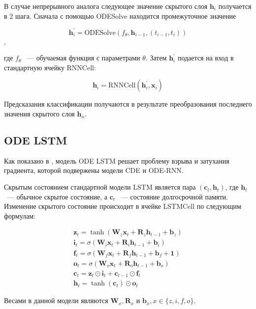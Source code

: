 \documentclass{article}
\newcommand{\bb}{\mathbf{b}}
\newcommand{\W}{\mathbf{W}}
\newcommand{\x}{\mathbf{x}}
\newcommand{\cc}{\mathbf{c}}
\newcommand{\h}{\mathbf{h}}
\begin{document}
В случае непрерывного аналога следующее значение скрытого слоя $\mathbf{h}_i$ получается в 2 шага. Сначала с помощью ODESolve находится промежуточное значение 

$$\mathbf{h}_i^{\prime} = \text{ODESolve}(f_{\theta}, \mathbf{h}_{i-1}, (t_{i-1}, t_i))$$,

где $f_{\theta}$ ~--- обучаемая функция с параметрами $\theta$. Затем $\mathbf{h}_i^{\prime}$ подается на вход в стандартную ячейку RNNCell:

$$\mathbf{h}_i = \text{RNNCell}(\mathbf{h}_i^{\prime}, \mathbf{x}_i)$$

Предсказания классификации получаются в результате преобразования последнего значения скрытого слоя $\mathbf{h}_n$. 

\subsection{ODE LSTM}

Как показано в \cite{lechner2020longterm}, модель ODE LSTM решает проблему взрыва и затухания градиента, которой подвержены модели CDE и ODE-RNN.

Скрытым состоянием стандартной модели LSTM является пара $(\mathbf{c}_t, \mathbf{h}_t)$, где $\mathbf{h}_t$ ~--- обычное скрытое состояние, а $\mathbf{c}_t$ ~--- состояние долгосрочной памяти. Изменение скрытого состояние происходит в ячейке LSTMCell по следующим формулам:

\begin{equation*}
\begin{array}{l}

\mathbf{z}_{t}=\tanh \left(\W_{z} \x_{t}+\mathbf{R}_{z} \h_{t-1}+\bb_{z}\right)\\
\mathbf{i}_{t}=\sigma\left(\W_{i} \x_{t}+\mathbf{R}_{i} \h_{t-1}+\bb_{i}\right)\\
\mathbf{f}_{t}=\sigma\left(\W_{f} \x_{t}+\mathbf{R}_{f} \h_{t-1}+\bb_{f}+\mathbf{1}\right)\\
\mathbf{o}_{t}=\sigma\left(\W_{o} \x_{t}+\mathbf{R}_{o} \h_{t-1}+\bb_{o}\right)\\
\cc_{t}=\mathbf{z}_{t} \odot \mathbf{i}_{t}+\cc_{t-1} \odot \mathbf{f}_{t} \\
\h_{t}=\tanh \left(\cc_{t}\right) \odot \mathbf{o}_{t}
\end{array}
\end{equation*}

Весами в данной модели являются $\mathbf{W}_x, \mathbf{R}_x$ и $\mathbf{b}_x, x\in \{z, i, f, o\}$. 
\end{document}

